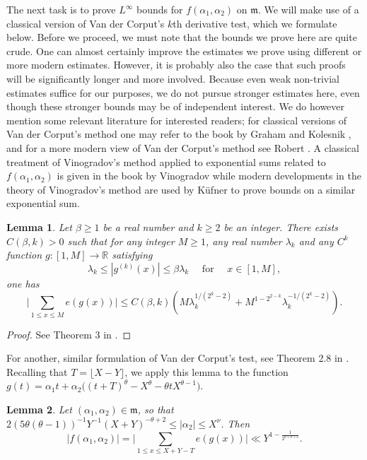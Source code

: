 \documentclass[11pt,reqno]{amsart}
\numberwithin{equation}{section}
\newtheorem{lemma}{Lemma}[section]
\begin{document}
The next task is to prove $L^{\infty}$ bounds for $f(\alpha_1,\alpha_2)$ on $\mathfrak{m}$. We will make use of a classical version of Van der Corput's $k$th derivative test, which we formulate below. 
Before we proceed, we must note that the bounds we prove here are quite crude. One can almost certainly improve the estimates we prove using different or more modern estimates. However, it is probably also the case that such proofs will be significantly longer and more involved. Because even weak non-trivial estimates suffice for our purposes, we do not pursue stronger estimates here, even though these stronger bounds may be of independent interest. We do however mention some relevant literature for interested readers; for classical versions of Van der Corput's method one may refer to the book by Graham and Kolesnik \cite{GraKol}, and for a more modern view of Van der Corput's method see Robert \cite{Robert}. A classical treatment of Vinogradov's method applied to exponential sums related to $f(\alpha_1,\alpha_2)$ is given in the book by Vinogradov \cite{Vino} while modern developments in the theory of Vinogradov's method are used by K\"{u}fner \cite{Kuf} to prove bounds on a similar exponential sum. 
\begin{lemma} \label{lem:VDC1}
Let $\beta \geq 1$ be a real number and $k \geq 2$ be an integer. There exists $C(\beta, k) > 0$ such that for any integer $M \geq 1$, any real number $\lambda_k$ and any $C^k$ function $g: [1, M] \to \mathbb{R}$ satisfying
\[ \lambda_k \leq |g^{(k)}(x)| \leq \beta \lambda_k \quad \text{ for } \quad x \in [1, M], \]
one has 
\[ \Big|\sum_{1 \leq x \leq M} e(g(x))\Big| \leq C(\beta, k) (M \lambda_k^{1/(2^k-2)} + M^{1-2^{2-k}} \lambda_k^{-1/(2^k-2)}). \]
\end{lemma} 

\begin{proof} See Theorem 3 in \cite{Robert}. 
\end{proof} 
For another, similar formulation of Van der Corput's test, see Theorem 2.8 in \cite{GraKol}. Recalling that $T = \lfloor X-Y \rfloor$, we apply this lemma to the function $g(t) = \alpha_1 t +\alpha_2\big((t+T)^{\theta}-X^{\theta}-\theta tX^{\theta-1}\big)$. 

\begin{lemma} \label{lem:weyl}
Let $(\alpha_1, \alpha_2) \in \mathfrak{m}$, so that $ 2 (5\theta(\theta-1))^{-1}Y^{-1}(X+Y)^{-\theta+2} \leq |\alpha_2| \leq X^{\nu} $. 
Then 
\[ |f(\alpha_1,\alpha_2)| = \Big|\sum_{1 \leq x \leq X+Y-T } e(g(x)) \Big| \ll Y^{1-\frac{1}{2^{\theta+\nu+3}}}. \]
\end{lemma} 
\end{document}
